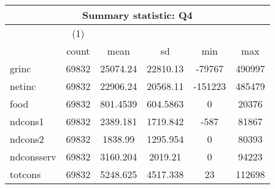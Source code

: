 \begin{tabular}{l*{1}{ccccc}}
\hline\hline
\multicolumn{6}{c}{Summary statistic: Q4}  \\
\hline
            &\multicolumn{1}{c}{(1)}&            &            &            &            \\
            &       count&        mean&          sd&         min&         max\\
\hline
grinc       &       69832&    25074.24&    22810.13&      -79767&      490997\\
netinc      &       69832&    22906.24&    20568.11&     -151223&      485479\\
food        &       69832&    801.4539&    604.5863&           0&       20376\\
ndcons1     &       69832&    2389.181&    1719.842&        -587&       81867\\
ndcons2     &       69832&     1838.99&    1295.954&           0&       80393\\
ndconsserv  &       69832&    3160.204&     2019.21&           0&       94223\\
totcons     &       69832&    5248.625&    4517.338&          23&      112698\\
\hline\hline
\end{tabular}
